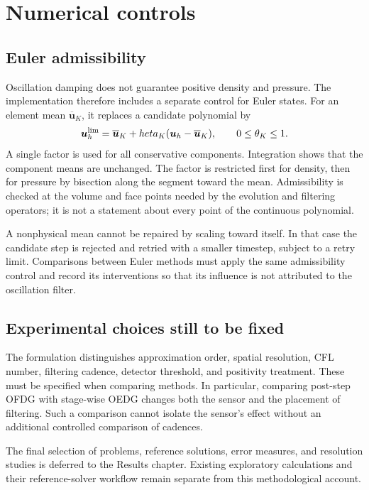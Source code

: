 \section{Numerical controls}
\label{sec:numerical-controls}
\subsection{Euler admissibility}
Oscillation damping does not guarantee positive density and pressure. The
implementation therefore includes a separate control for Euler states. For
an element mean $\overline{\boldsymbol u}_K$, it replaces a candidate polynomial
by
\begin{equation}
 \boldsymbol u_h^{\rm lim}
 =\overline{\boldsymbol u}_K+	heta_K
          (\boldsymbol u_h-\overline{\boldsymbol u}_K),
 \qquad 0\leq\theta_K\leq1.
\end{equation}
A single factor is used for all conservative components. Integration shows
that the component means are unchanged. The factor is restricted first for
density, then for pressure by bisection along the segment toward the mean.
Admissibility is checked at the volume and face points needed by the evolution
and filtering operators; it is not a statement about every point of the
continuous polynomial.

A nonphysical mean cannot be repaired by scaling toward itself. In that case
the candidate step is rejected and retried with a smaller timestep, subject to
a retry limit. Comparisons between Euler methods must apply the same
admissibility control and record its interventions so that its influence is
not attributed to the oscillation filter.


\subsection{Experimental choices still to be fixed}
The formulation distinguishes approximation order, spatial resolution, CFL
number, filtering cadence, detector threshold, and positivity treatment.
These must be specified when comparing methods. In particular, comparing
post-step OFDG with stage-wise OEDG changes both the sensor and the placement
of filtering. Such a comparison cannot isolate the sensor's effect without
an additional controlled comparison of cadences.

The final selection of problems, reference solutions, error measures, and
resolution studies is deferred to the Results chapter. Existing exploratory
calculations and their reference-solver workflow remain separate from this
methodological account.
